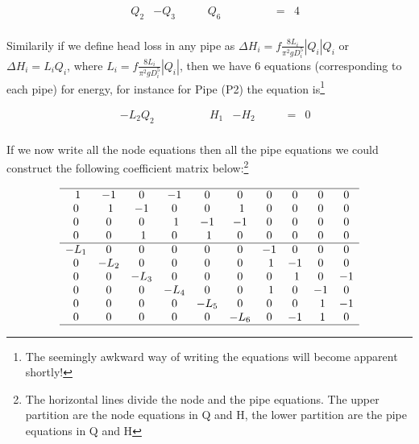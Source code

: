 \begin{displaymath}
\begin{matrix}
~& Q_2 & -Q_3  & ~ & ~ & Q_6 & ~ & ~ & ~ &~ & =  & 4\\
 \end{matrix}
 \end{displaymath}
 
Similarily if we define head loss in any pipe as $\Delta H_i = f \frac{8 L_i}{\pi^2 g D_i^5} |Q_i| Q_i$ or $\Delta H_i = L_i Q_i$, where $L_i = f \frac{8 L_i}{\pi^2 g D_i^5} |Q_i|$, then we have 6 equations (corresponding to each pipe) for energy, for instance for Pipe (P2) the equation is\footnote{The seemingly awkward way of writing the equations will become apparent shortly!}

\begin{displaymath}
\begin{matrix}
~& -L_2Q_2& ~ & ~ & ~ & ~& H_1 & -H_2 & ~ & ~ & = & 0\\
 \end{matrix}
 \end{displaymath}
 
 If we now write all the node equations then all the pipe equations we could construct the following coefficient matrix below:\footnote{The horizontal lines divide the node and the pipe equations.  The upper partition are the node equations in Q and H, the lower partition are the pipe equations in Q and H}
 
\begin{displaymath}
\begin{matrix}
\hline
~1&-1 & 0  & -1 & 0 & 0 & 0 & 0 & 0 &0 \\
0&~1 & -1  & 0 & 0 &~1 & 0 & 0 & 0 &0 \\
0& 0 & 0 &~1 & -1 & -1 & 0 & 0 & 0 &0 \\
0& 0 &~1  & 0 &~1 & 0 & 0  & 0 & 0 &0 \\
\hline
-L_1& 0& 0 & 0 & 0 & 0 & -1 & 0 & 0 &0 \\
0& -L_2& 0 & 0 & 0 & 0&~1 & -1 & 0 &0 \\
0& 0& -L_3 & 0 & 0 & 0& 0 &~1 & 0 & -1 \\
0& 0& 0 & -L_4 & 0 & 0&~1 & 0 & -1 & 0 \\
0& 0& 0 & 0 & -L_5 & 0& 0 & 0 &~1 & -1 \\
0& 0& 0 &0 & 0 & -L_6& 0 & -1 &~1 & 0 \\
\hline
 \end{matrix}
 \end{displaymath}
 
